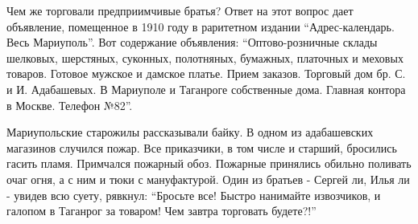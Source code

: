 Чем же торговали предприимчивые братья? Ответ на этот вопрос дает объявление,
помещенное в 1910 году в раритетном издании \enquote{Адрес-календарь. Весь Мариуполь}.
Вот содержание объявления: \enquote{Оптово-розничные склады шелковых, шерстяных,
суконных, полотняных, бумажных, платочных и меховых товаров. Готовое мужское и
дамское платье. Прием заказов. Торговый дом бр. С. и И. Адабашевых. В Мариуполе
и Таганроге собственные дома. Главная контора в Москве. Телефон №82}.

Мариупольские старожилы рассказывали байку. В одном из адабашевских магазинов
случился пожар. Все приказчики, в том числе и  старший, бросились гасить пламя.
Примчался пожарный обоз. Пожарные принялись обильно поливать очаг огня, а с ним
и тюки с мануфактурой. Один из братьев - Сергей ли, Илья ли - увидев всю суету,
рявкнул: \enquote{Бросьте все! Быстро нанимайте извозчиков, и галопом в Таганрог за
товаром! Чем завтра торговать будете?!}
